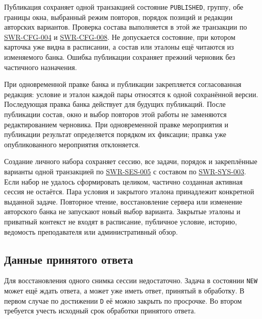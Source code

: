 \documentclass[12pt,a4paper]{article}
\begin{document}
\hypertarget{совместная-фиксация-и-неизменность-опубликованных-данных}{}

Публикация сохраняет одной транзакцией состояние \texttt{PUBLISHED}, группу, обе границы окна, выбранный режим повторов, порядок позиций и редакции авторских вариантов. Проверка состава выполняется в этой же транзакции по {\hyperlink{swr-cfg-004}{SWR-CFG-004}} и {\hyperlink{swr-cfg-008}{SWR-CFG-008}}. Не допускается состояние, при котором карточка уже видна в расписании, а состав или эталоны ещё читаются из изменяемого банка. Ошибка публикации сохраняет прежний черновик без частичного назначения.

При одновременной правке банка и публикации закрепляется согласованная редакция: условие и эталон каждой пары относятся к одной сохранённой версии. Последующая правка банка действует для будущих публикаций. После публикации состав, окно и выбор повторов этой работы не заменяются редактированием черновика. При одновременной правке мероприятия и публикации результат определяется порядком их фиксации; правка уже опубликованного мероприятия отклоняется.

Создание личного набора сохраняет сессию, все задачи, порядок и закреплённые варианты одной транзакцией по {\href{DOC-06.2\_Сессии\_задач\_и\_планировщик.pdf\#swr-ses-005}{SWR-SES-005}} с составом по {\hyperlink{swr-sys-003}{SWR-SYS-003}}. Если набор не удалось сформировать целиком, частично созданная активная сессия не остаётся. Пара условия и закрытого эталона принадлежит конкретной выданной задаче. Повторное чтение, восстановление сервера или изменение авторского банка не запускают новый выбор варианта. Закрытые эталоны и приватный контекст не входят в расписание, публичное условие, историю, ведомость преподавателя или административный обзор.

\subsection{Данные принятого ответа}\label{ux434ux430ux43dux43dux44bux435-ux43fux440ux438ux43dux44fux442ux43eux433ux43e-ux43eux442ux432ux435ux442ux430}

\hypertarget{данные-принятого-ответа}{}

Для восстановления одного снимка сессии недостаточно. Задача в состоянии \texttt{NEW} может ещё ждать ответа, а может уже иметь ответ, принятый в обработку. В первом случае по достижении \texttt{D} её можно закрыть по просрочке. Во втором требуется учесть исходный срок обработки принятого ответа.
\end{document}
